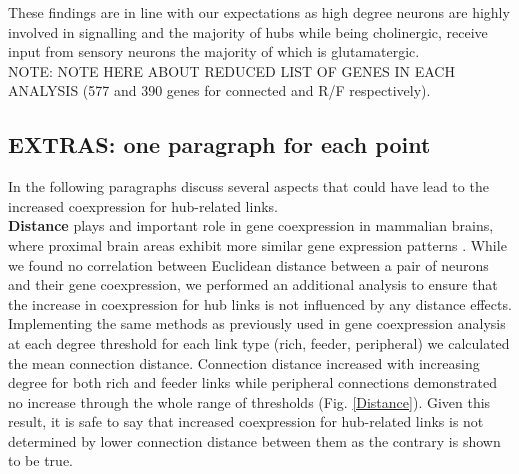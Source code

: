 \documentclass[10pt,letterpaper]{article}
\begin{document}
These findings are in line with our expectations as high degree neurons are highly involved in signalling and the majority of hubs while being cholinergic, receive input from sensory neurons the majority of which is glutamatergic. \\
NOTE: NOTE HERE ABOUT REDUCED LIST OF GENES IN EACH ANALYSIS (577 and 390 genes for connected and R/F respectively). 

\subsection*{EXTRAS: one paragraph for each point}
In the following paragraphs discuss several aspects that could have lead to the increased coexpression for hub-related links. \\

\textbf{Distance} plays and important role in gene coexpression in mammalian brains, where proximal brain areas exhibit more similar gene expression patterns \citep{Fulcher2016, Krienen2016}. 
While we found no correlation between Euclidean distance between a pair of neurons and their gene coexpression, we performed an additional analysis to ensure that the increase in coexpression for hub links is not influenced by any distance effects.
Implementing the same methods as previously used in gene coexpression analysis at each degree threshold for each link type (rich, feeder, peripheral) we calculated the mean connection distance.
Connection distance increased with increasing degree for both rich and feeder links while peripheral connections demonstrated no increase through the whole range of thresholds (Fig. \ref{Distance}). 
Given this result, it is safe to say that increased coexpression for hub-related links is not determined by lower connection distance between them as the contrary is shown to be true. \\

\end{document}
